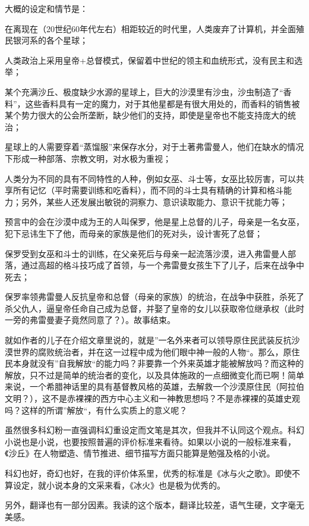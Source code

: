 大概的设定和情节是：
\begin{enumerate*}
    \item 在离现在（20世纪60年代左右）相距较近的时代里，人类废弃了计算机，并全面殖民银河系的各个星球；
    \item 人类政治上采用皇帝+总督模式，保留着中世纪的领主和血统形式，没有民主和选举；
    \item 某个充满沙丘、极度缺少水源的星球上，巨大的沙漠里有沙虫，沙虫制造了“香料”，这些香料具有一定的魔力，对于其他星都是有很大用处的，而香料的销售被某个势力很大的公会所垄断，缺少他们的支持，即使是皇帝也不能支持庞大的统治；
    \item 星球上的人需要穿着“蒸馏服”来保存水分，对于土著弗雷曼人，他们在缺水的情况下形成一种部落、宗教文明，对水极为重视；
    \item 人类分为不同的具有不同特性的人种，例如女巫、斗士等，女巫比较厉害，可以共享所有记忆（平时需要训练和吃香料），而不同的斗士具有精确的计算和格斗能力；另外，某些人还发展出敏锐的洞察力、意识读取能力、意识干扰能力等；
    \item 预言中的会在沙漠中成为王的人叫保罗，他是星上总督的儿子，母亲是一名女巫，犯下忌讳生下了他，而母亲的家族是他们的死对头，设计害死了总督；
    \item 保罗受到女巫和斗士的训练，在父亲死后与母亲一起流落沙漠，进入弗雷曼人部落，通过高超的格斗技巧成了首领，与一个弗雷曼女孩生下了儿子，后来在战争中死去；
    \item 保罗率领弗雷曼人反抗皇帝和总督（母亲的家族）的统治，在战争中获胜，杀死了杀父仇人，逼皇帝任命自己成为总督，并娶了皇帝的女儿以获取帝位继承权（此时一旁的弗雷曼妻子竟然同意了？）。故事结束。
\end{enumerate*}

就如作者的儿子在介绍文章里说的，就是”一名外来者可以领导原住民武装反抗沙漠世界的腐败统治者，并在这一过程中成为他们眼中神一般的人物“。那么，原住民本身就没有”自我解放“的能力吗？非要靠一个外来英雄才能被解放吗？而这种的解放，只不过是简单的统治者的变化，以及具体施政的一点细微变化而已啊！简单来说，一个希腊神话里的具有基督教风格的英雄，去解救一个沙漠原住民（阿拉伯文明？），这不是赤裸裸的西方中心主义和一神教思想吗？不是赤裸裸的英雄史观吗？这样的所谓”解放“，有什么实质上的意义呢？

虽然很多科幻粉一直强调科幻重设定而文笔是其次，但我并不认同这个观点。科幻小说也是小说，也要按照普遍的评价标准来看待。如果以小说的一般标准来看，《沙丘》在人物塑造、情节推进、细节描写方面只能算是勉强及格的小说。

科幻也好，奇幻也好，在我的评价体系里，优秀的标准是《冰与火之歌》。即使不算设定，就小说本身的文采来看，《冰火》也是极为优秀的。

另外，翻译也有一部分因素。我读的这个版本，翻译比较差，语气生硬，文字毫无美感。